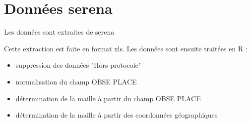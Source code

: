 \renewcommand{\monlhead}{Données serena}
\section{Données serena}
Les données sont extraites de serena

Cette extraction est faite en format xls. Les données sont ensuite traitées en R :
\begin{itemize}
\item suppression des données "Hors protocole"
\item normalisation du champ OBSE PLACE
\item détermination de la maille à partir du champ OBSE PLACE
\item détermination de la maille à partir des coordonnées géographiques
\end{itemize}

